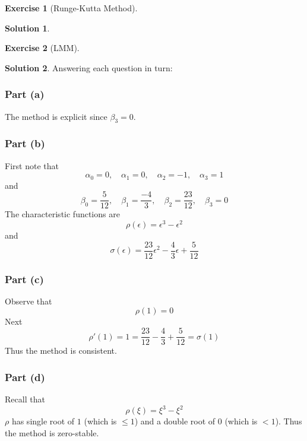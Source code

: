\documentclass[12pt]{article}
\theoremstyle{definition}
\newcommand{\e}{\epsilon}
\newtheorem{exercise}{\color{YellowOrange}Exercise}
\theoremstyle{definition}
\newtheorem{solution}{\color{Goldenrod}Solution}
\begin{document}
\begin{exercise}[Runge-Kutta Method]

\end{exercise}
\begin{solution}

\end{solution}

\begin{exercise}[LMM]

\end{exercise}
\begin{solution}
Answering each question in turn: 
\subsubsection*{Part (a)}
The method is explicit since $\beta_{3} = 0$. 

\subsubsection*{Part (b)}
First note that
\begin{equation}
	\alpha_0 = 0, \quad \alpha_1 = 0, \quad \alpha_2 = -1, \quad \alpha_3 = 1
\end{equation}
and
\begin{equation}
	\beta_0 = \frac{5}{12}, \quad \beta_1 = \frac{-4}{3}, \quad \beta_2 = \frac{23}{12}, \quad \beta_3 = 0
\end{equation}
The characteristic functions are
\begin{equation}
	\rho(\epsilon) = \e^3 - \e^2
\end{equation}
and
\begin{equation}
	\sigma(\e) = \frac{23}{12} \e^2 - \frac{4}{3}\e + \frac{5}{12}
\end{equation}

\subsubsection*{Part (c)}
Observe that
\begin{equation}
	\rho(1) = 0
\end{equation}
Next 
\begin{equation}
	\rho'(1) = 1 = \frac{23}{12} - \frac{4}{3} + \frac{5}{12} = \sigma(1)
\end{equation}
Thus the method is consistent. 

\subsubsection*{Part (d)}
Recall that
\begin{equation}
	\rho(\xi) = \xi^3 - \xi^2
\end{equation}
$\rho$ has single root of $1$ (which is $\leq 1$) and a double root of $0$ (which is $< 1$). Thus the method is zero-stable. 

\end{solution}
\end{document}
